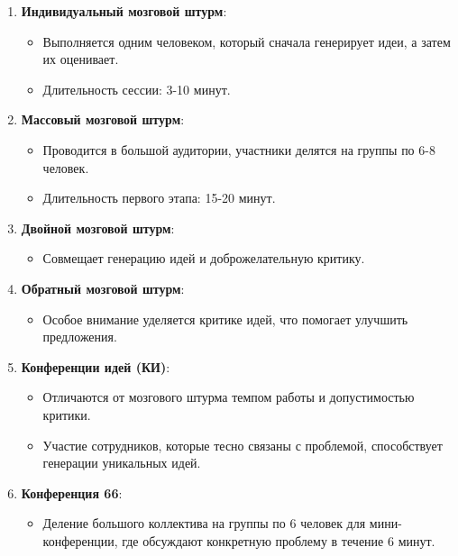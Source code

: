 \documentclass[
]{article}
\providecommand{\tightlist}{%
  \setlength{\itemsep}{0pt}\setlength{\parskip}{0pt}}
\begin{document}
\begin{enumerate}
\def\labelenumi{\arabic{enumi}.}
\item
  \textbf{Индивидуальный мозговой штурм}:

  \begin{itemize}
  \tightlist
  \item
    Выполняется одним человеком, который сначала генерирует идеи, а
    затем их оценивает.
  \item
    Длительность сессии: 3-10 минут.
  \end{itemize}
\item
  \textbf{Массовый мозговой штурм}:

  \begin{itemize}
  \tightlist
  \item
    Проводится в большой аудитории, участники делятся на группы по 6-8
    человек.
  \item
    Длительность первого этапа: 15-20 минут.
  \end{itemize}
\item
  \textbf{Двойной мозговой штурм}:

  \begin{itemize}
  \tightlist
  \item
    Совмещает генерацию идей и доброжелательную критику.
  \end{itemize}
\item
  \textbf{Обратный мозговой штурм}:

  \begin{itemize}
  \tightlist
  \item
    Особое внимание уделяется критике идей, что помогает улучшить
    предложения.
  \end{itemize}
\item
  \textbf{Конференции идей (КИ)}:

  \begin{itemize}
  \tightlist
  \item
    Отличаются от мозгового штурма темпом работы и допустимостью
    критики.
  \item
    Участие сотрудников, которые тесно связаны с проблемой, способствует
    генерации уникальных идей.
  \end{itemize}
\item
  \textbf{Конференция 66}:

  \begin{itemize}
  \tightlist
  \item
    Деление большого коллектива на группы по 6 человек для
    мини-конференции, где обсуждают конкретную проблему в течение 6
    минут.
  \end{itemize}
\end{enumerate}
\end{document}
